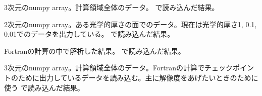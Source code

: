 \documentclass[letterpaper,10pt,dvipdfmx,report]{sphinxmanual}
\begin{document}

\begin{fulllineitems}
\label{\detokenize{io:R2D2.R2D2_data.qq}}
3次元のnumpy array。計算領域全体のデータ。{\hyperref[\detokenize{io:R2D2.R2D2_data.read_qq}]{}} で読み込んだ結果。

\end{fulllineitems}


\begin{fulllineitems}
\label{\detokenize{io:R2D2.R2D2_data.qt}}
2次元のnumpy array。ある光学的厚さの面でのデータ。現在は光学的厚さ1, 0.1, 0.01でのデータを出力している。 {\hyperref[\detokenize{io:R2D2.R2D2_data.read_qq_tau}]{}} で読み込んだ結果。

\end{fulllineitems}


\begin{fulllineitems}
\label{\detokenize{io:R2D2.R2D2_data.vc}}
Fortranの計算の中で解析した結果。 {\hyperref[\detokenize{io:R2D2.R2D2_data.read_vc}]{}} で読み込んだ結果。

\end{fulllineitems}


\begin{fulllineitems}
\label{\detokenize{io:R2D2.R2D2_data.qc}}
3次元のnumpy array。計算領域全体のデータ。Fortranの計算でチェックポイントのために出力しているデータを読み込む。主に解像度をあげたいときのために使う {\hyperref[\detokenize{io:R2D2.R2D2_data.read_qq_check}]{}} で読み込んだ結果。

\end{fulllineitems}
\end{document}
